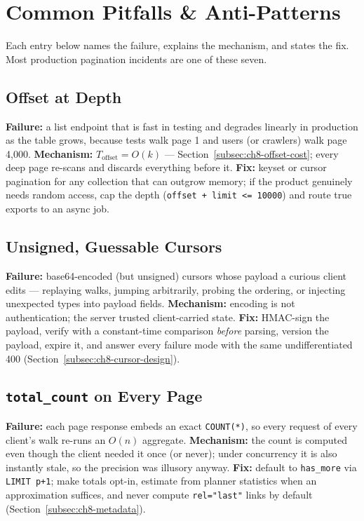 \section{Common Pitfalls \& Anti-Patterns}
\label{sec:ch8-pitfalls}

Each entry below names the failure, explains the mechanism, and states the
fix. Most production pagination incidents are one of these seven.

\subsection{Offset at Depth}
\textbf{Failure:} a list endpoint that is fast in testing and degrades
linearly in production as the table grows, because tests walk page 1 and
users (or crawlers) walk page 4{,}000. \textbf{Mechanism:}
$T_{\mathrm{offset}} = O(k)$ --- Section~\ref{subsec:ch8-offset-cost}; every
deep page re-scans and discards everything before it. \textbf{Fix:} keyset
or cursor pagination for any collection that can outgrow memory; if the
product genuinely needs random access, cap the depth
(\texttt{offset + limit <= 10000}) and route true exports to an async job.

\subsection{Unsigned, Guessable Cursors}
\textbf{Failure:} base64-encoded (but unsigned) cursors whose payload a
curious client edits --- replaying walks, jumping arbitrarily, probing the
ordering, or injecting unexpected types into payload fields.
\textbf{Mechanism:} encoding is not authentication; the server trusted
client-carried state. \textbf{Fix:} HMAC-sign the payload, verify with a
constant-time comparison \emph{before} parsing, version the payload, expire
it, and answer every failure mode with the same undifferentiated 400
(Section~\ref{subsec:ch8-cursor-design}).

\subsection{\texttt{total\_count} on Every Page}
\textbf{Failure:} each page response embeds an exact \texttt{COUNT(*)}, so
every request of every client's walk re-runs an $O(n)$ aggregate.
\textbf{Mechanism:} the count is computed even though the client needed it
once (or never); under concurrency it is also instantly stale, so the
precision was illusory anyway. \textbf{Fix:} default to \texttt{has\_more}
via \texttt{LIMIT p+1}; make totals opt-in, estimate from planner statistics
when an approximation suffices, and never compute \texttt{rel="last"} links
by default (Section~\ref{subsec:ch8-metadata}).

